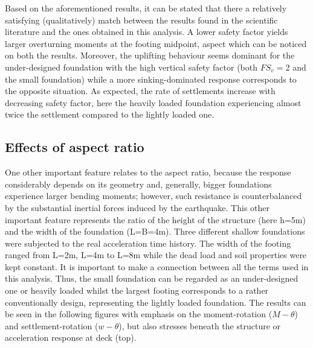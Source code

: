  
 Based on the aforementioned results, it can be stated that there a relatively satisfying (qualitatively) match between the results found in the scientific literature and the ones obtained in this analysis. A lower safety factor yields larger overturning moments at the footing midpoint, aspect which can be noticed on both the results. Moreover, the uplifting behaviour seems dominant for the under-designed foundation with the high vertical safety factor (both $FS_v=2$ and the small foundation) while a more sinking-dominated response corresponds to the opposite situation. As expected, the rate of settlements increase with decreasing safety factor, here the heavily loaded foundation experiencing almost twice the settlement compared to the lightly loaded one.
 
\newpage
\subsection{Effects of aspect ratio}
One other important feature relates to the aspect ratio, because the response considerably depends on its geometry and, generally, bigger foundations experience larger bending moments; however, such resistance is counterbalanced by the substantial inertial forces induced by the earthquake.  This other important feature represents the ratio of the height of the structure (here h=5m) and the width of the foundation (L=B=4m). Three different shallow foundations were subjected to the real acceleration time history. The width of the footing ranged from L=2m, L=4m to L=8m while the dead load and soil properties were kept constant. It is important to make a connection between all the terms used in this analysis. Thus, the small foundation can be regarded as an under-designed one or heavily loaded whilst the largest footing corresponds to a rather conventionally design, representing the lightly loaded foundation. The results can be seen in the following figures with emphasis on the moment-rotation ($M-\theta$) and settlement-rotation ($w-\theta$), but also stresses beneath the structure or acceleration response at deck (top).


